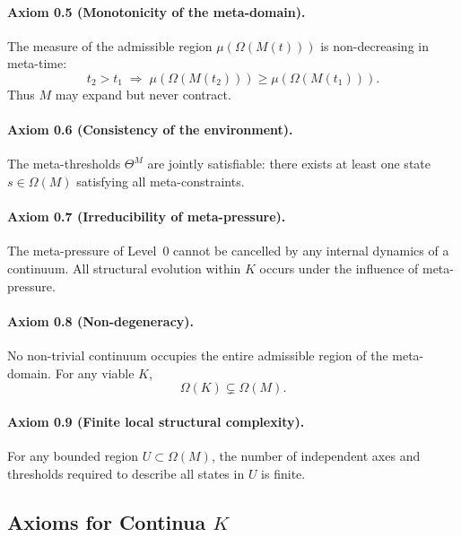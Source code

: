 \paragraph{Axiom 0.5 (Monotonicity of the meta-domain).}
The measure of the admissible region \(\mu(\Omega(M(t)))\) is non-decreasing in meta-time:
\[
  t_2>t_1 \;\Rightarrow\; \mu(\Omega(M(t_2)))\ge \mu(\Omega(M(t_1))).
\]
Thus \(M\) may expand but never contract.

\paragraph{Axiom 0.6 (Consistency of the environment).}
The meta-thresholds \(\Theta^M\) are jointly satisfiable: there exists at least one state \(s\in\Omega(M)\) satisfying all meta-constraints.

\paragraph{Axiom 0.7 (Irreducibility of meta-pressure).}
The meta-pressure of Level~0 cannot be cancelled by any internal dynamics of a continuum.
All structural evolution within \(K\) occurs under the influence of meta-pressure.

\paragraph{Axiom 0.8 (Non-degeneracy).}
No non-trivial continuum occupies the entire admissible region of the meta-domain.
For any viable \(K\),
\[
  \Omega(K)\subsetneq \Omega(M).
\]

\paragraph{Axiom 0.9 (Finite local structural complexity).}
For any bounded region \(U\subset \Omega(M)\), the number of independent axes and thresholds required to describe all states in \(U\) is finite.

\subsection{Axioms for Continua \texorpdfstring{\(K\)}{K}}

